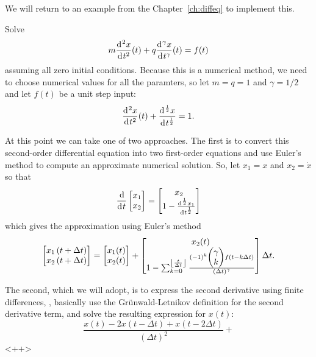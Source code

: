 We will return to an example from the Chapter~\ref{ch:diffeq} to implement this.

\begin{example}
  Solve
  \begin{equation*}
    m \frac{\operatorname{d}\hspace*{-1pt}^2 x}{\operatorname{d}\hspace*{-1pt} t^2}(t) + q \frac{\operatorname{d}\hspace*{-1pt}^\gamma x}{\operatorname{d}\hspace*{-1pt} t^\gamma}(t) = f(t)
  \end{equation*}
  assuming all zero initial conditions. Because this is a numerical method, we need to choose numerical values for all the paramters, so let $m=q=1$ and $\gamma = 1/2$ and let $f(t)$ be a unit step input:
  \begin{equation*}
    \frac{\operatorname{d}\hspace*{-1pt}^2 x}{\operatorname{d}\hspace*{-1pt} t^2}(t) + \frac{\operatorname{d}\hspace*{-1pt}^\frac{1}{2} x}{\operatorname{d}\hspace*{-1pt} t^\frac{1}{2}} = 1.
  \end{equation*}

  At this point we can take one of two approaches. The first is to convert this second-order differential equation into two first-order equations and use Euler's method to compute an approximate numerical solution. So, let $x_1 = x$ and $x_2 = \dot x$ so that
  \begin{equation*}
    \frac{\operatorname{d}\hspace*{-1pt}}{\operatorname{d}\hspace*{-1pt} t}\begin{bmatrix}
    x_1 \\ x_2
    \end{bmatrix} = 
    \begin{bmatrix}
      x_2 \\
    1 - \frac{\operatorname{d}\hspace*{-1pt}^\frac{1}{2} x_1}{\operatorname{d}\hspace*{-1pt} t^\frac{1}{2}}
    \end{bmatrix}
  \end{equation*}
  which gives the approximation using Euler's method
  \begin{equation*}
    \begin{bmatrix}
      x_1\left(t + \Delta t \right) \\
      x_2\left(t + \Delta t \right)
    \end{bmatrix} =
    \begin{bmatrix}
      x_1(t) \\ x_2(t)
    \end{bmatrix} +
    \begin{bmatrix}
      x_2(t) \\
      1 - \sum_{k=0}^{\left\lfloor \frac{t}{\Delta t} \right\rfloor} \frac{(-1)^k  \begin{pmatrix} \gamma \\ k
      \end{pmatrix} f \left( t - k \Delta t \right)}{\left( \Delta t \right)^\gamma}
    \end{bmatrix} 
    \Delta t.
  \end{equation*}

  The second, which we will adopt, is to express the second derivative using finite differences, \ie, basically use the Gr\"unwald-Letnikov definition for the second derivative term, and solve the resulting expression for $x(t)$:
  \begin{equation*}
    \frac{x(t) - 2 x(t - \Delta t) + x(t - 2 \Delta t)}{\left( \Delta t \right)^2} +  
  \end{equation*}<++>
\end{example}
